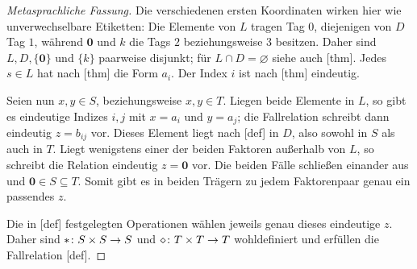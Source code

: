 \documentclass[main.tex]{subfiles}
\begin{document}
\newpage
{}
\begin{proof}[Metasprachliche Fassung]
Die verschiedenen ersten Koordinaten wirken hier wie unverwechselbare
Etiketten: Die Elemente von \(L\) tragen Tag \(0\), diejenigen von \(D\)
Tag \(1\), während \(\mathbf0\) und \(k\) die Tags \(2\) beziehungsweise
\(3\) besitzen. Daher sind \(L,D,\{\mathbf0\}\) und \(\{k\}\) paarweise
disjunkt; für \(L\cap D=\varnothing\) siehe auch
[thm]. Jedes \(s\in L\) hat
nach [thm] die Form \(a_i\).
Der Index \(i\) ist nach
[thm] eindeutig.

Seien nun \(x,y\in S\), beziehungsweise \(x,y\in T\). Liegen beide
Elemente in \(L\), so gibt es eindeutige Indizes \(i,j\) mit
\(x=a_i\) und \(y=a_j\); die Fallrelation schreibt dann eindeutig
\(z=b_{ij}\) vor. Dieses Element liegt nach
[def] in \(D\), also sowohl in
\(S\) als auch in \(T\). Liegt wenigstens einer der beiden Faktoren
außerhalb von \(L\), so schreibt die Relation eindeutig \(z=\mathbf0\)
vor. Die beiden Fälle schließen einander aus und
\(\mathbf0\in S\subseteq T\). Somit gibt es in beiden Trägern zu jedem
Faktorenpaar genau ein passendes \(z\).

Die in [def] festgelegten Operationen
wählen jeweils genau dieses eindeutige \(z\). Daher sind
\(\mathbin{\ast}\colon S\times S\to S\) und
\(\mathbin{\diamond}\colon T\times T\to T\) wohldefiniert und erfüllen die
Fallrelation [def].
\end{proof}
\end{document}
